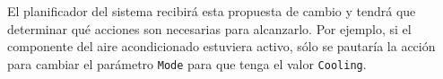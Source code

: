El planificador del sistema recibirá esta propuesta de cambio y tendrá que determinar qué acciones son necesarias para alcanzarlo. Por ejemplo, si el componente del aire acondicionado estuviera activo, sólo se pautaría la acción para cambiar el parámetro \texttt{Mode} para que tenga el valor \texttt{Cooling}.
